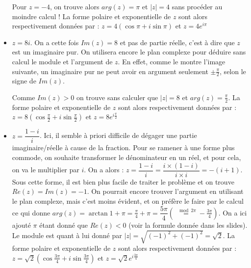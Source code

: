 \documentclass{article}
\begin{document}
\begin{itemize}
\begin{center}
\end{center}
Pour $z = -4$, on trouve alors $arg(z) = \pi$ et $|z| = 4$ sans procéder au moindre calcul ! La forme polaire et exponentielle de $z$ sont alors respectivement données par : $z = 4(\cos{\pi}+i\sin{\pi})$ et $z = 4e^{i\pi}$
\item $z = 8i$. On a cette fois $Im(z) = 8$ et pas de partie réelle, c'est à dire que $z$ est un imaginaire pur. On utilisera encore le plan complexe pour déduire sans calcul le module et l'argument de $z$. En effet, comme le montre l'image suivante, un imaginaire pur ne peut avoir en argument seulement $\pm \frac{\pi}{2}$, selon le signe de $Im(z)$. 

\begin{center}
\end{center}
Comme $Im(z)>0$ on trouve sans calculer que $|z|= 8$ et $arg(z)=\frac{\pi}{2}$. La forme polaire et exponentielle de $z$ sont alors respectivement données par : $z = 8(\cos{\frac{\pi}{2}}+i\sin{\frac{\pi}{2}})$ et $z = 8e^{i\frac{\pi}{2}}$
\item $z = \dfrac{1-i}{i}$. Ici, il semble à priori difficile de dégager une partie imaginaire/réelle à cause de la fraction. Pour se ramener à une forme plus commode, on souhaite transformer le dénominateur en un réel, et pour cela, on va le multiplier par $i$. On a alors : $z = \dfrac{1-i}{i}= \dfrac{i\times(1-i)}{i\times i} = -(i+1)$. Sous cette forme, il est bien plus facile de traiter le problème et on trouve $Re(z) = Im(z) = -1$. On pourrait encore trouver l'argument en utilisant le plan complexe, mais c'est moins évident, et on préfère le faire par le calcul ce qui donne $arg(z) = \arctan {1}+\pi = \frac{\pi}{4} + \pi = \dfrac{5\pi}{4} \left( \overset{\mod 2\pi}{=} -\frac{3\pi}{4} \right)$. On a ici ajouté $\pi$ étant donné que $Re(z) < 0$ (voir la formule donnée dans les slides). Le module est quant à lui donné par $|z| = \sqrt{(-1)^2+(-1)^2} = \sqrt{2}$. La forme polaire et exponentielle de $z$ sont alors respectivement données par : $z = \sqrt{2}(\cos{\frac{3\pi}{4}}+i\sin{\frac{3\pi}{4}})$ et $z = \sqrt{2}e^{i\frac{3\pi}{4}}$

\end{itemize}
\end{document}
